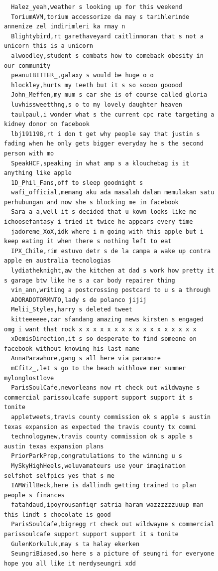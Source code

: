 \begin{figure}[htpb]
\begin{verbatim}
  Halez_yeah,weather s looking up for this weekend
  ToriumAVM,torium accessorize da may s tarihlerinde annenize zel indirimleri ka rmay n
  Blightybird,rt garethaveyard caitlinmoran that s not a unicorn this is a unicorn
  alwoodley,student s combats how to comeback obesity in our community
  peanutBITTER_,galaxy s would be huge o o
  hlockley,hurts my teeth but it s so soooo gooood
  John_Meffen,my mum s car she is of course called gloria
  luvhissweetthng,s o to my lovely daughter heaven
  taulpaul,i wonder what s the current cpc rate targeting a kidney donor on facebook
  lbj191198,rt i don t get why people say that justin s fading when he only gets bigger everyday he s the second person with mo
  SpeakHCF,speaking in what amp s a klouchebag is it anything like apple
  1D_Phil_Fans,off to sleep goodnight s
  wafi_official,memang aku ada masalah dalam memulakan satu perhubungan and now she s blocking me in facebook
  Sara_a_a,well it s decided that u kown looks like me ichoosefantasy i tried it twice he appears every time
  jadoreme_XoX,idk where i m going with this apple but i keep eating it when there s nothing left to eat
  IPX_Chile,rim estuvo detr s de la campa a wake up contra apple en australia tecnologias
  lydiatheknight,aw the kitchen at dad s work how pretty it s garage btw like he s a car body repairer thing
  vin_ann,writing a postcrossing postcard to u s a through
  ADORADOTORMNTO,lady s de polanco jijij
  Melii_Styles,harry s deleted tweet
  kitteeeeee,car sfandang amazing news kirsten s engaged omg i want that rock x x x x x x x x x x x x x x x x x
  xDemisDirection,it s so desperate to find someone on facebook without knowing his last name
  AnnaParawhore,gang s all here via paramore
  mCfitz_,let s go to the beach withlove mer summer mylonglostlove
  ParisSoulCafe,neworleans now rt check out wildwayne s commercial parissoulcafe support support support it s tonite
  appletweets,travis county commission ok s apple s austin texas expansion as expected the travis county tx commi
  technologynew,travis county commission ok s apple s austin texas expansion plans
  PriorParkPrep,congratulations to the winning u s
  MySkyHighHeels,weluvamateurs use your imagination selfshot selfpics yes that s me
  IAMWillBeck,here is dallindh getting trained to plan people s finances
  fatahdaud,ipoyrousanfiqr satria haram wazzzzzzuuup man this lindt s chocolate is good
  ParisSoulCafe,bigregg rt check out wildwayne s commercial parissoulcafe support support support it s tonite
  GulenKorkuluk,may s ta halay ekerken
  SeungriBiased,so here s a picture of seungri for everyone hope you all like it nerdyseungri xdd

\end{verbatim}
\end{figure}
